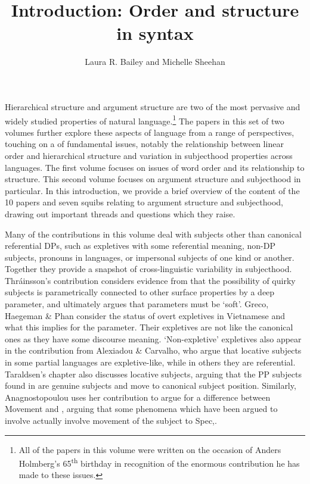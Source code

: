 \documentclass[output=paper]{langsci/langscibook}
\author{Laura R. Bailey and Michelle Sheehan \affiliation{University of Kent and Anglia Ruskin University}
}
\title{Introduction: Order and structure in syntax}
\begin{document}
Hierarchical structure and argument structure are two of the most pervasive and widely studied properties of natural language.\footnote{All of the papers in this volume were written on the occasion of Anders Holmberg’s 65\textsuperscript{th} birthday in recognition of the enormous contribution he has made to these issues.} The papers in this set of two volumes further explore these aspects of language from a range of perspectives, touching on a  of fundamental issues, notably the relationship between linear order and hierarchical structure and variation in subjecthood properties across languages. The first volume focuses on issues of word order and its relationship to structure. This second volume focuses on argument structure and subjecthood in particular. In this introduction, we provide a brief overview of the content of the 10 papers and seven squibs relating to argument structure and subjecthood, drawing out important threads and questions which they raise.   

Many of the contributions in this volume deal with subjects other than canonical referential DPs, such as expletives with some referential meaning, non-DP subjects, pronouns in  languages, or impersonal subjects of one kind or another. Together they provide a snapshot of cross-linguistic variability in subjecthood. Thráinsson’s contribution considers evidence from  that the possibility of quirky subjects is parametrically connected to other surface properties by a deep parameter, and ultimately argues that parameters must be ‘soft’. Greco, Haegeman \& Phan consider the status of overt expletives in Vietnamese and what this implies for the  parameter. Their expletives are not like the canonical ones as they have some discourse meaning. ‘Non-expletive’ expletives also appear in the contribution from Alexiadou \& Carvalho, who argue that locative subjects in some partial  languages are expletive-like, while in others they are referential. Taraldsen’s chapter also discusses locative subjects, arguing that the PP subjects found in  are genuine subjects and move to canonical subject position. Similarly, Anagnostopoulou uses her contribution to argue for a difference between Movement and , arguing that some phenomena which have been argued to involve  actually involve movement of the subject to Spec,. 
\end{document}
